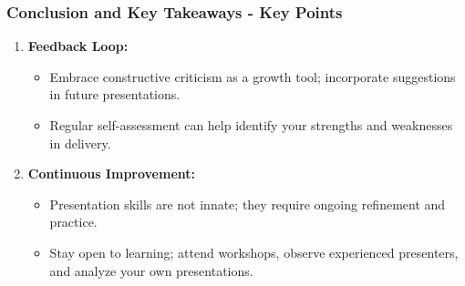 \documentclass[aspectratio=169]{beamer}
\begin{document}
\begin{frame}[fragile]
    \frametitle{Conclusion and Key Takeaways - Key Points}
    \begin{enumerate}
        \item \textbf{Feedback Loop:}
        \begin{itemize}
            \item Embrace constructive criticism as a growth tool; incorporate suggestions in future presentations.
            \item Regular self-assessment can help identify your strengths and weaknesses in delivery.
        \end{itemize}

        \item \textbf{Continuous Improvement:}
        \begin{itemize}
            \item Presentation skills are not innate; they require ongoing refinement and practice.
            \item Stay open to learning; attend workshops, observe experienced presenters, and analyze your own presentations.
        \end{itemize}
    \end{enumerate}
\end{frame}
\end{document}
